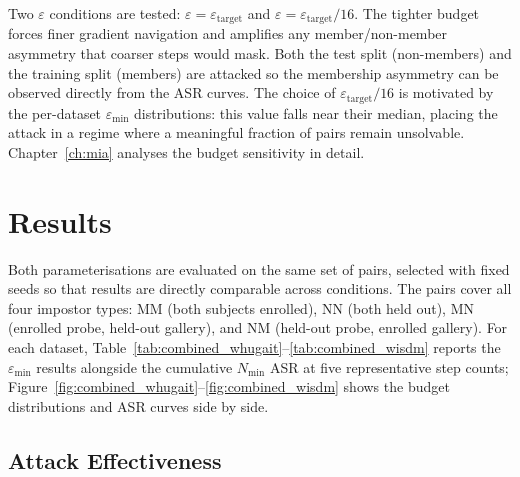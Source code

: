 Two $\varepsilon$ conditions are tested: $\varepsilon = \varepsilon_\text{target}$ and $\varepsilon = \varepsilon_\text{target}/16$. The tighter budget forces finer gradient navigation and amplifies any member/non-member asymmetry that coarser steps would mask. Both the test split (non-members) and the training split (members) are attacked so the membership asymmetry can be observed directly from the ASR curves. The choice of $\varepsilon_\text{target}/16$ is motivated by the per-dataset $\varepsilon_\text{min}$ distributions: this value falls near their median, placing the attack in a regime where a meaningful fraction of pairs remain unsolvable. Chapter~\ref{ch:mia} analyses the budget sensitivity in detail.

\providecommand{\pholder}{\textbf{??}}

\section{Results}
\label{sec:ev_results}

Both parameterisations are evaluated on the same set of pairs, selected with fixed seeds so that results are directly comparable across conditions. The pairs cover all four impostor types: MM (both subjects enrolled), NN (both held out), MN (enrolled probe, held-out gallery), and NM (held-out probe, enrolled gallery). For each dataset, Table~\ref{tab:combined_whugait}--\ref{tab:combined_wisdm} reports the $\varepsilon_\text{min}$ results alongside the cumulative $N_\text{min}$ ASR at five representative step counts; Figure~\ref{fig:combined_whugait}--\ref{fig:combined_wisdm} shows the budget distributions and ASR curves side by side.

\subsection{Attack Effectiveness}
\label{ssec:ev_effectiveness}

